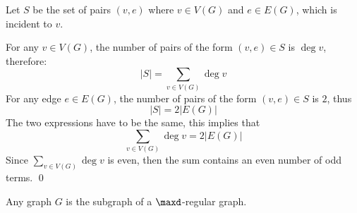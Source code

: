 \begin{prf}
    Let $S$ be the set of pairs $(v, e)$ where $v \in V(G)$ and $e \in E(G)$, which is incident to $v$.

    For any $v \in V(G)$, the number of pairs of the form $(v, e) \in S$ is $\deg{v}$, therefore:
    \begin{equation*}
        |S| = \sum_{v \in V(G)}\deg{v}
    \end{equation*}
    For any edge $e \in E(G)$, the number of pairs of the form $(v, e) \in S$ is $2$, thus
    \begin{equation*}
        |S| = 2|E(G)|
    \end{equation*}
    The two expressions have to be the same, this implies that
    \begin{equation*}
        \sum_{v \in V(G)}\deg{v} = 2|E(G)|
    \end{equation*}
    Since $\sum_{v \in V(G)}\deg{v}$ is even, then the sum contains an even number of odd terms. \qed
\end{prf}
\begin{pipo}
    Any graph $G$ is the subgraph of a $\maxd$-regular graph.
\end{pipo}
